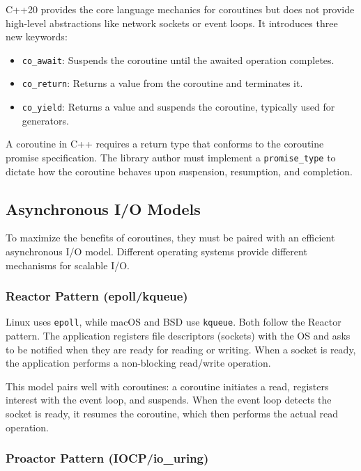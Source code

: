 C++20 provides the core language mechanics for coroutines but does not provide high-level abstractions like network sockets or event loops. It introduces three new keywords:
\begin{itemize}
    \item \texttt{co\_await}: Suspends the coroutine until the awaited operation completes.
    \item \texttt{co\_return}: Returns a value from the coroutine and terminates it.
    \item \texttt{co\_yield}: Returns a value and suspends the coroutine, typically used for generators.
\end{itemize}

A coroutine in C++ requires a return type that conforms to the coroutine promise specification. The library author must implement a \texttt{promise\_type} to dictate how the coroutine behaves upon suspension, resumption, and completion.

\subsection{Asynchronous I/O Models}

To maximize the benefits of coroutines, they must be paired with an efficient asynchronous I/O model. Different operating systems provide different mechanisms for scalable I/O.

\subsubsection{Reactor Pattern (epoll/kqueue)}

Linux uses \texttt{epoll}, while macOS and BSD use \texttt{kqueue}. Both follow the Reactor pattern. The application registers file descriptors (sockets) with the OS and asks to be notified when they are ready for reading or writing. When a socket is ready, the application performs a non-blocking read/write operation.

This model pairs well with coroutines: a coroutine initiates a read, registers interest with the event loop, and suspends. When the event loop detects the socket is ready, it resumes the coroutine, which then performs the actual read operation.

\subsubsection{Proactor Pattern (IOCP/io\_uring)}

